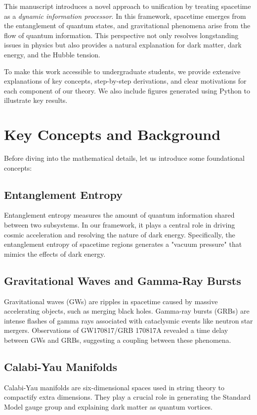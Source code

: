 \documentclass[12pt, a4paper]{article}
\begin{document}
This manuscript introduces a novel approach to unification by treating spacetime as a \textit{dynamic information processor}. In this framework, spacetime emerges from the entanglement of quantum states, and gravitational phenomena arise from the flow of quantum information. This perspective not only resolves longstanding issues in physics but also provides a natural explanation for dark matter, dark energy, and the Hubble tension.

To make this work accessible to undergraduate students, we provide extensive explanations of key concepts, step-by-step derivations, and clear motivations for each component of our theory. We also include figures generated using Python to illustrate key results.

\section{Key Concepts and Background}
Before diving into the mathematical details, let us introduce some foundational concepts:

\subsection{Entanglement Entropy}
Entanglement entropy measures the amount of quantum information shared between two subsystems. In our framework, it plays a central role in driving cosmic acceleration and resolving the nature of dark energy. Specifically, the entanglement entropy of spacetime regions generates a "vacuum pressure" that mimics the effects of dark energy.

\subsection{Gravitational Waves and Gamma-Ray Bursts}
Gravitational waves (GWs) are ripples in spacetime caused by massive accelerating objects, such as merging black holes. Gamma-ray bursts (GRBs) are intense flashes of gamma rays associated with cataclysmic events like neutron star mergers. Observations of GW170817/GRB 170817A revealed a time delay between GWs and GRBs, suggesting a coupling between these phenomena.

\subsection{Calabi-Yau Manifolds}
Calabi-Yau manifolds are six-dimensional spaces used in string theory to compactify extra dimensions. They play a crucial role in generating the Standard Model gauge group and explaining dark matter as quantum vortices.
\end{document}
